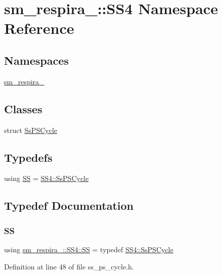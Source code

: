 \hypertarget{namespacesm__respira__1_1_1SS4}{}\section{sm\+\_\+respira\+\_\+:\+:S\+S4 Namespace Reference}
\label{namespacesm__respira__1_1_1SS4}
\subsection*{Namespaces}
\begin{DoxyCompactItemize}
\item 
 \hyperlink{namespacesm__respira__1_1_1SS4_1_1sm__respira__1}{sm\+\_\+respira\+\_}
\end{DoxyCompactItemize}
\subsection*{Classes}
\begin{DoxyCompactItemize}
\item 
struct \hyperlink{structsm__respira__1_1_1SS4_1_1SsPSCycle}{Ss\+P\+S\+Cycle}
\end{DoxyCompactItemize}
\subsection*{Typedefs}
\begin{DoxyCompactItemize}
\item 
using \hyperlink{namespacesm__respira__1_1_1SS4_a80df246d3c72c5fac7bfa7ffc9a91982}{SS} = \hyperlink{structsm__respira__1_1_1SS4_1_1SsPSCycle}{S\+S4\+::\+Ss\+P\+S\+Cycle}
\end{DoxyCompactItemize}


\subsection{Typedef Documentation}
\mbox{\label{namespacesm__respira__1_1_1SS4_a80df246d3c72c5fac7bfa7ffc9a91982}} 
\subsubsection{\texorpdfstring{SS}{SS}}
{\footnotesize\ttfamily using \hyperlink{namespacesm__respira__1_1_1SS4_a80df246d3c72c5fac7bfa7ffc9a91982}{sm\+\_\+respira\+\_\+::\+S\+S4\+::\+SS} = typedef \hyperlink{structsm__respira__1_1_1SS4_1_1SsPSCycle}{S\+S4\+::\+Ss\+P\+S\+Cycle}}



Definition at line 48 of file ss\+\_\+ps\+\_\+cycle.\+h.

